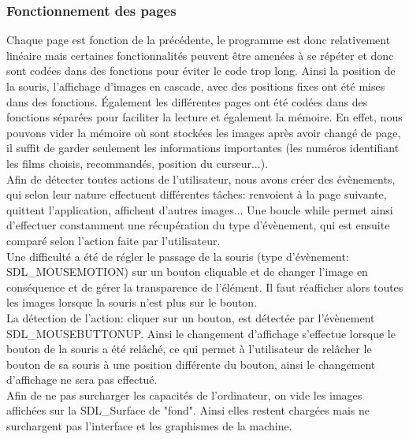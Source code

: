 \documentclass[light]{ceri}
\begin{document}
\subsubsection{Fonctionnement des pages}
\indent Chaque page est fonction de la précédente, le programme est donc relativement linéaire mais certaines fonctionnalités peuvent être amenées à se répéter et donc sont codées dans des fonctions pour éviter le code trop long. Ainsi la position de la souris, l'affichage d'images en cascade, avec des positions fixes ont été mises dans des fonctions. Également les différentes pages ont été codées dans des fonctions séparées pour faciliter la lecture et également la mémoire. En effet, nous pouvons vider la mémoire où sont stockées les images après avoir changé de page, il suffit de garder seulement les informations importantes (les numéros identifiant les films choisis, recommandés, position du curseur...).\\
\indent Afin de détecter toutes actions de l'utilisateur, nous avons créer des évènements, qui selon leur nature effectuent différentes tâches: renvoient à la page suivante, quittent l'application, affichent d'autres images... Une boucle while permet ainsi d'effectuer constamment une récupération du type d'évènement, qui est ensuite comparé selon l'action faite par l'utilisateur.\\
\indent Une difficulté a été de régler le passage de la souris (type d'évènement: SDL\_MOUSEMOTION) sur un bouton cliquable et de changer l'image en conséquence et de gérer la transparence de l'élément. Il faut réafficher alors toutes les images lorsque la souris n'est plus sur le bouton.\\
\indent La détection de l'action: cliquer sur un bouton, est détectée par l'évènement SDL\_MOUSEBUTTONUP. Ainsi le changement d'affichage s'effectue lorsque le bouton de la souris a été relâché, ce qui permet à l'utilisateur de relâcher le bouton de sa souris à une position différente du bouton, ainsi le changement d'affichage ne sera pas effectué.\\
\indent Afin de ne pas surcharger les capacités de l'ordinateur, on vide les images affichées sur la SDL\_Surface de "fond". Ainsi elles restent chargées mais ne surchargent pas l'interface et les graphismes de la machine.
\end{document}
